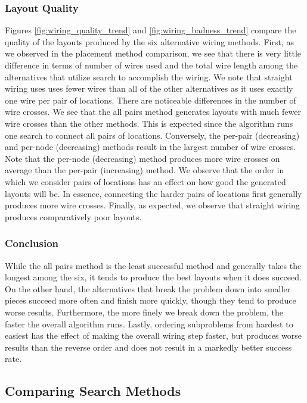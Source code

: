 \subsubsection{Layout Quality}
Figures \ref{fig:wiring_quality_trend} and
\ref{fig:wiring_badness_trend} compare the
quality of the layouts produced by the six alternative wiring methods. First,
as we observed in the placement method comparison, we see that there is very
little difference in terms of number of wires used and the total wire length
among the alternatives that utilize search to accomplish the wiring. We note
that straight wiring uses uses fewer wires than all of the other alternatives
as it uses exactly one wire per pair of locations.
There are noticeable differences in the number of wire crosses. We see
that the all pairs method generates layouts with much fewer wire crosses than
the other methods. This is expected since the algorithm runs one search to
connect all pairs of locations. Conversely, the per-pair (decreasing) and
per-node (decreasing) methods
result in the largest number of wire crosses. Note that
the per-node (decreasing) method produces more wire crosses on average than the
per-pair (increasing) method.
We observe that the order in which we consider pairs of
locations has an effect on how good the generated layouts will be.
In essence, connecting the harder pairs of locations first generally produces
more wire crosses.
Finally, as expected, we observe that straight wiring produces comparatively
poor layouts.

\subsubsection{Conclusion}
While the all pairs method is the least successful
method and generally takes the longest among the six,
it tends to produce the best layouts when it does succeed. On the other hand,
the alternatives that break the problem down into smaller pieces succeed more
often and finish more quickly, though they tend to produce worse results.
Furthermore,
the more finely we break down the problem, the faster the overall algorithm runs.
Lastly, ordering subproblems from hardest to easiest has the effect of making the
overall wiring step faster, but produces worse results than the reverse
order and does not result in a markedly better success rate.

\subsection{Comparing Search Methods}

